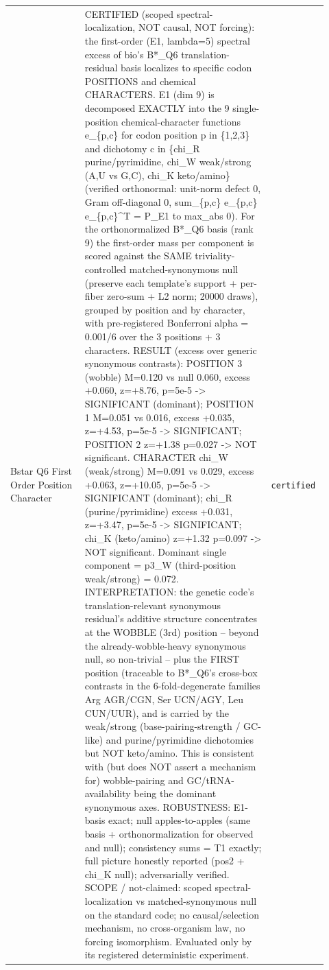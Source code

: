 \begin{longtable}{>{\raggedright\arraybackslash}p{0.22\linewidth}>{\raggedright\arraybackslash}p{0.55\linewidth}>{\raggedright\arraybackslash}p{0.15\linewidth}}
Bstar Q6 First Order Position Character & CERTIFIED (scoped spectral-localization, NOT causal, NOT forcing): the first-order (E1, lambda=5) spectral excess of bio's B*\_Q6 translation-residual basis localizes to specific codon POSITIONS and chemical CHARACTERS. E1 (dim 9) is decomposed EXACTLY into the 9 single-position chemical-character functions e\_\{p,c\} for codon position p in \{1,2,3\} and dichotomy c in \{chi\_R purine/pyrimidine, chi\_W weak/strong (A,U vs G,C), chi\_K keto/amino\} (verified orthonormal: unit-norm defect 0, Gram off-diagonal 0, sum\_\{p,c\} e\_\{p,c\} e\_\{p,c\}\textasciicircum{}T = P\_E1 to max\_abs 0). For the orthonormalized B*\_Q6 basis (rank 9) the first-order mass per component is scored against the SAME triviality-controlled matched-synonymous null (preserve each template's support + per-fiber zero-sum + L2 norm; 20000 draws), grouped by position and by character, with pre-registered Bonferroni alpha = 0.001/6 over the 3 positions + 3 characters. RESULT (excess over generic synonymous contrasts): POSITION 3 (wobble) M=0.120 vs null 0.060, excess +0.060, z=+8.76, p=5e-5 -> SIGNIFICANT (dominant); POSITION 1 M=0.051 vs 0.016, excess +0.035, z=+4.53, p=5e-5 -> SIGNIFICANT; POSITION 2 z=+1.38 p=0.027 -> NOT significant. CHARACTER chi\_W (weak/strong) M=0.091 vs 0.029, excess +0.063, z=+10.05, p=5e-5 -> SIGNIFICANT (dominant); chi\_R (purine/pyrimidine) excess +0.031, z=+3.47, p=5e-5 -> SIGNIFICANT; chi\_K (keto/amino) z=+1.32 p=0.097 -> NOT significant. Dominant single component = p3\_W (third-position weak/strong) = 0.072. INTERPRETATION: the genetic code's translation-relevant synonymous residual's additive structure concentrates at the WOBBLE (3rd) position -- beyond the already-wobble-heavy synonymous null, so non-trivial -- plus the FIRST position (traceable to B*\_Q6's cross-box contrasts in the 6-fold-degenerate families Arg AGR/CGN, Ser UCN/AGY, Leu CUN/UUR), and is carried by the weak/strong (base-pairing-strength / GC-like) and purine/pyrimidine dichotomies but NOT keto/amino. This is consistent with (but does NOT assert a mechanism for) wobble-pairing and GC/tRNA-availability being the dominant synonymous axes. ROBUSTNESS: E1-basis exact; null apples-to-apples (same basis + orthonormalization for observed and null); consistency sums = T1 exactly; full picture honestly reported (pos2 + chi\_K null); adversarially verified. SCOPE / not-claimed: scoped spectral-localization vs matched-synonymous null on the standard code; no causal/selection mechanism, no cross-organism law, no forcing isomorphism. Evaluated only by its registered deterministic experiment. & \texttt{certified} \\

\end{longtable}
